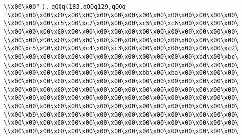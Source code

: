 \verb|\\x00\x00"|\newline
\verb|),|\newline
\verb|qQQq(183,qQQq129,qQQq|\newline
\verb|"\x00\x00\x00\x00\x00\x00\x00\x00\x00\x00\x00\x00\x00\x00\x00\x00\|\newline
\verb|\\x00\x00\x00\xc5\x00\xc7\x00\x00\x00\xc5\x00\xc6\x00\x00\x00\x00\|\newline
\verb|\\x00\x00\x00\x00\x00\x00\x00\x00\x00\x00\x00\x00\x00\x00\x00\x00\|\newline
\verb|\\x00\x00\x00\x00\x00\x00\x00\x00\x00\x00\x00\x00\x00\x00\x00\x00\|\newline
\verb|\\x00\xc5\x00\x00\x00\xc4\x00\xc3\x00\x00\x00\x00\x00\x00\x00\xc2\|\newline
\verb|\\x00\x00\x00\x00\x00\x00\x00\x00\x00\x00\x00\x00\x00\xbd\x00\xbc\|\newline
\verb|\\x00\x00\x00\x00\x00\x00\x00\x00\x00\x00\x00\x00\x00\x00\x00\x00\|\newline
\verb|\\x00\x00\x00\x00\x00\x00\x00\x00\x00\xbb\x00\xba\x00\x00\x00\x00\|\newline
\verb|\\x00\x00\x00\x00\x00\x00\x00\x00\x00\x00\x00\x00\x00\x00\x00\x00\|\newline
\verb|\\x00\x00\x00\x00\x00\x00\x00\x00\x00\x00\x00\x00\x00\x00\x00\x00\|\newline
\verb|\\x00\x00\x00\x00\x00\x00\x00\x00\x00\x00\x00\x00\x00\x00\x00\x00\|\newline
\verb|\\x00\x00\x00\x00\x00\x00\x00\x00\x00\x00\x00\x00\x00\x00\x00\x00\|\newline
\verb|\\x00\xb9\x00\x00\x00\x00\x00\x00\x00\x00\x00\x00\x00\x00\x00\x00\|\newline
\verb|\\x00\x00\x00\x00\x00\x00\x00\x00\x00\x00\x00\x00\x00\x00\x00\x00\|\newline
\verb|\\x00\x00\x00\x00\x00\x00\x00\x00\x00\x00\x00\x00\x00\x00\x00\x00\|\newline
